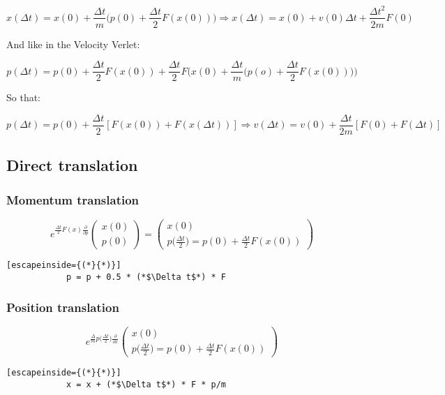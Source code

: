$$x(\Delta t) = x(0) + \frac{\Delta t}{m}\biggl(p(0) + \frac{\Delta t}{2}F(x(0))\biggr)\Rightarrow x(\Delta t) = x(0) + v(0)\Delta t + \frac{\Delta t^2}{2m}F(0)$$

And like in the Velocity Verlet:

$$p(\Delta t) = p(0) + \frac{\Delta t}{2}F(x(0)) + \frac{\Delta t}{2}F\biggl(x(0) + \frac{\Delta t}{m}\biggl(p(o) + \frac{\Delta t}{2}F(x(0))\biggr)\biggr)$$

So that:

$$p(\Delta t) = p(0) + \frac{\Delta t}{2}[F(x(0)) + F(x(\Delta t))]\Rightarrow v(\Delta t) = v(0) + \frac{\Delta t}{2m}[F(0) + F(\Delta t)]$$

	\subsection{Direct translation}

		\subsubsection{Momentum translation}

		$$e^{\frac{\Delta t}{2}F(x)\frac{\partial}{\partial p}}\begin{pmatrix}x(0)\\p(0)\end{pmatrix} = \begin{pmatrix} x(0)\\ p\biggl(\frac{\Delta t}{2}\biggr) = p(0) + \frac{\Delta t}{2}F(x(0))\end{pmatrix}$$

		\begin{lstlisting}[escapeinside={(*}{*)}]
			p = p + 0.5 * (*$\Delta t$*) * F
		\end{lstlisting}

		\subsubsection{Position translation}

		$$e^{\frac{\Delta}{m}p\biggl(\frac{\Delta t}{2}\biggr)\frac{\partial}{\partial x}}\begin{pmatrix}x(0)\\p\biggl(\frac{\Delta t}{2}\biggr) = p(0) + \frac{\Delta t}{2}F(x(0))\end{pmatrix}$$

		\begin{lstlisting}[escapeinside={(*}{*)}]
			x = x + (*$\Delta t$*) * F * p/m
		\end{lstlisting}

